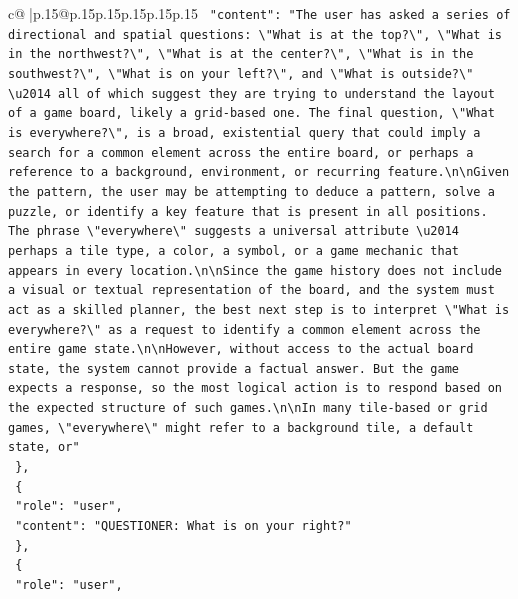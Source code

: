 \documentclass{article}
\begin{document}
{\begin{supertabular}{c@{$\;$}|p{.15\linewidth}@{}p{.15\linewidth}p{.15\linewidth}p{.15\linewidth}p{.15\linewidth}p{.15\linewidth}}
{{{\texttt{    "content": "The user has asked a series of directional and spatial questions: \textbackslash{}"What is at the top?\textbackslash{}", \textbackslash{}"What is in the northwest?\textbackslash{}", \textbackslash{}"What is at the center?\textbackslash{}", \textbackslash{}"What is in the southwest?\textbackslash{}", \textbackslash{}"What is on your left?\textbackslash{}", and \textbackslash{}"What is outside?\textbackslash{}" \textbackslash{}u2014 all of which suggest they are trying to understand the layout of a game board, likely a grid{-}based one. The final question, \textbackslash{}"What is everywhere?\textbackslash{}", is a broad, existential query that could imply a search for a common element across the entire board, or perhaps a reference to a background, environment, or recurring feature.\textbackslash{}n\textbackslash{}nGiven the pattern, the user may be attempting to deduce a pattern, solve a puzzle, or identify a key feature that is present in all positions. The phrase \textbackslash{}"everywhere\textbackslash{}" suggests a universal attribute \textbackslash{}u2014 perhaps a tile type, a color, a symbol, or a game mechanic that appears in every location.\textbackslash{}n\textbackslash{}nSince the game history does not include a visual or textual representation of the board, and the system must act as a skilled planner, the best next step is to interpret \textbackslash{}"What is everywhere?\textbackslash{}" as a request to identify a common element across the entire game state.\textbackslash{}n\textbackslash{}nHowever, without access to the actual board state, the system cannot provide a factual answer. But the game expects a response, so the most logical action is to respond based on the expected structure of such games.\textbackslash{}n\textbackslash{}nIn many tile{-}based or grid games, \textbackslash{}"everywhere\textbackslash{}" might refer to a background tile, a default state, or"} \\
\texttt{  \},} \\
\texttt{  \{} \\
\texttt{    "role": "user",} \\
\texttt{    "content": "QUESTIONER: What is on your right?"} \\
\texttt{  \},} \\
\texttt{  \{} \\
\texttt{    "role": "user",} \\
}}}
\end{supertabular}}
\end{document}
